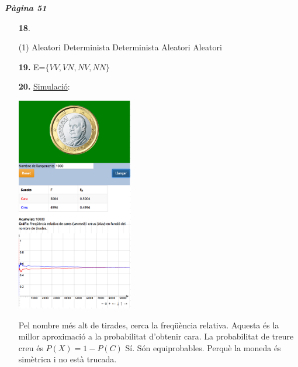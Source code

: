 \documentclass[a4paper, pdf, twoside]{book}
\begin{document}
\begin{multicols}{2}

{\textbf{\em Pàgina 51}} \hrulefill
\begin{enumerate}
\vspace{0.25cm}



 \item[\fontfamily{phv}\selectfont\color{blue}\textbf{18}. ] 
 \begin{tasks}[column-sep=1em, item-indent=1.3333em](1)
	 \task Aleatori
	 \task Determinista
	 \task Determinista
	 \task Aleatori
	 \task Aleatori
\end{tasks}
 \end{enumerate}
\begin{enumerate}
\vspace{0.25cm}
\item[\fontfamily{phv}\selectfont\color{blue}\textbf{19. }] 
E=$\{VV, VN, NV, NN \}$
\vspace{0.25cm}
\item[\fontfamily{phv}\selectfont\color{blue}\textbf{20. }] 
\href {https://piworld.es/\#!/home/activity/71/0}{Simulació}:\par \includegraphics [width=0.4\textwidth ]{img-sol/t4-sim-monedes} \par \begin{tasks} \task Pel nombre més alt de tirades, cerca la freqüència relativa. Aquesta és la millor aproximació a la probabilitat d'obtenir cara. La probabilitat de treure creu és $P(X)=1-P(C)$ \task Sí. Són equiprobables. Perquè la moneda és simètrica i no està trucada.\end{tasks}
 \end{enumerate}
\vspace{0.3cm}


\end{multicols}
\end{document}
